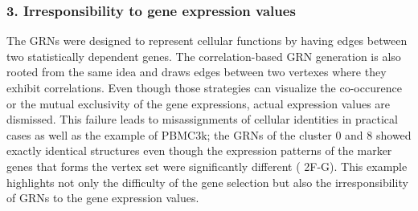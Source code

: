\documentclass{article}
\begin{document}
\subsubsection*{3. Irresponsibility to gene expression values}
The GRNs were designed to represent cellular functions by having edges between two statistically dependent genes. 
The correlation-based GRN generation is also rooted from the same idea and draws edges between two vertexes 
where they exhibit correlations. Even though those strategies can visualize the co-occurence or the mutual exclusivity of 
the gene expressions, actual expression values are dismissed. This failure leads to misassignments of cellular identities 
in practical cases as well as the example of PBMC3k; the GRNs of the cluster 0 and 8 showed exactly 
identical structures even though the expression patterns of the marker genes that forms the vertex set were significantly 
different (\figurename{ 2F-G}). This example highlights not only the difficulty of the gene selection but also 
the irresponsibility of GRNs to the gene expression values.
\end{document}
